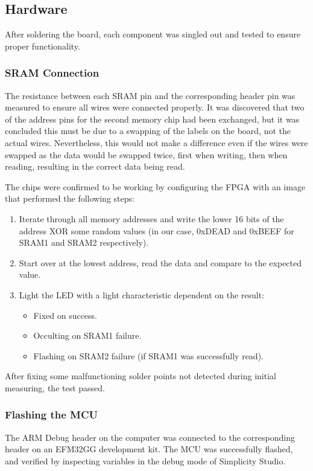 \subsection{Hardware}
After soldering the board, each component was singled out and tested to ensure proper functionality.

\subsubsection{SRAM Connection}
The resistance between each SRAM pin and the corresponding header pin was measured to ensure all wires were connected properly.
It was discovered that two of the address pins for the second memory chip had been exchanged, but it was concluded this must be due to a swapping of the labels on the board, not the actual wires.
Nevertheless, this would not make a difference even if the wires were swapped as the data would be swapped twice, first when writing, then when reading, resulting in the correct data being read.

The chips were confirmed to be working by configuring the FPGA with an image that performed the following steps:
\begin{enumerate}
    \item Iterate through all memory addresses and write the lower 16 bits of the address XOR some random values (in our case, 0xDEAD and 0xBEEF for SRAM1 and SRAM2 respectively).
    \item Start over at the lowest address, read the data and compare to the expected value.
    \item Light the LED with a light characteristic dependent on the result:
        \begin{itemize}
            \item Fixed on success.
            \item Occulting on SRAM1 failure.
            \item Flashing on SRAM2 failure (if SRAM1 was successfully read).
        \end{itemize}
\end{enumerate}

After fixing some malfunctioning solder points not detected during initial measuring, the test passed.

\subsubsection{Flashing the MCU}
The ARM Debug header on the computer was connected to the corresponding header on an EFM32GG development kit. The MCU was successfully flashed, and verified by inspecting variables in the debug mode of Simplicity Studio.

